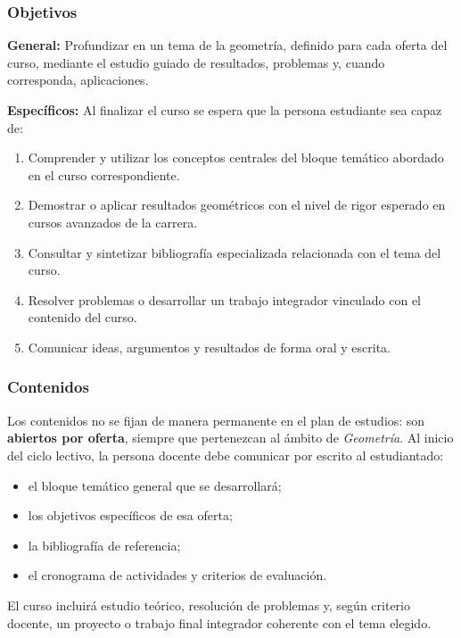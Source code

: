 \begin{refsection}
\subsubsection*{Objetivos}

\textbf{General:} Profundizar en un tema de la geometría, definido para cada oferta del curso, mediante el estudio guiado de resultados, problemas y, cuando corresponda, aplicaciones.

\textbf{Específicos:} Al finalizar el curso se espera que la persona estudiante sea capaz de:

\begin{enumerate}
\item Comprender y utilizar los conceptos centrales del bloque temático abordado en el curso correspondiente.
\item Demostrar o aplicar resultados geométricos con el nivel de rigor esperado en cursos avanzados de la carrera.
\item Consultar y sintetizar bibliografía especializada relacionada con el tema del curso.
\item Resolver problemas o desarrollar un trabajo integrador vinculado con el contenido del curso.
\item Comunicar ideas, argumentos y resultados de forma oral y escrita.
\end{enumerate}

\subsubsection*{Contenidos}

Los contenidos no se fijan de manera permanente en el plan de estudios: son \textbf{abiertos por oferta}, siempre que pertenezcan al ámbito de \emph{Geometría}. Al inicio del ciclo lectivo, la persona docente debe comunicar por escrito al estudiantado:

\begin{itemize}
\item el bloque temático general que se desarrollará;
\item los objetivos específicos de esa oferta;
\item la bibliografía de referencia;
\item el cronograma de actividades y criterios de evaluación.
\end{itemize}

El curso incluirá estudio teórico, resolución de problemas y, según criterio docente, un proyecto o trabajo final integrador coherente con el tema elegido.


\end{refsection}
